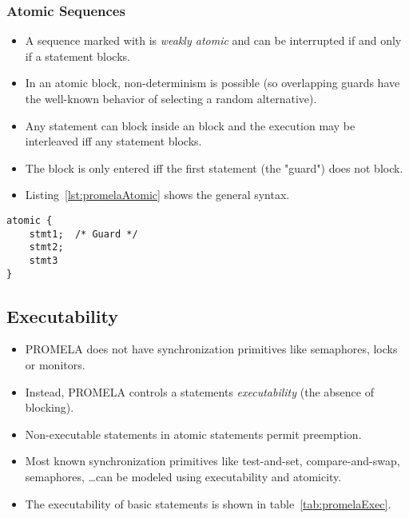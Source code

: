 		\subsubsection{Atomic Sequences}
			\label{sec:atomic}

			\begin{itemize}
				\item A sequence marked with  is \textit{weakly atomic} and can be interrupted if and only if a statement blocks.
				\item In an atomic block, non-determinism is possible (so overlapping guards have the well-known behavior of selecting a random alternative).
				\item Any statement can block inside an  block and the execution may be interleaved iff any statement blocks.
				\item The block is only entered iff the first statement (the "guard") does not block.
				\item Listing~\ref{lst:promelaAtomic} shows the general syntax.
			\end{itemize}

			\begin{lstlisting}[caption = { Atomic Sequence in PROMELA }, label = lst:promelaAtomic, language = PROMELA]
atomic {
	stmt1;  /* Guard */
	stmt2;
	stmt3
}
				\end{lstlisting}

	\subsection{Executability} %
		\label{sec:promelaExec}

		\begin{itemize}
			\item PROMELA does not have synchronization primitives like semaphores, locks or monitors.
			\item Instead, PROMELA controls a statements \textit{executability} (the absence of blocking).
			\item Non-executable statements in atomic statements permit preemption.
			\item Most known synchronization primitives like test-and-set, compare-and-swap, semaphores, \dots can be modeled using executability and atomicity.
			\item The executability of basic statements is shown in table~\ref{tab:promelaExec}.
		\end{itemize}

